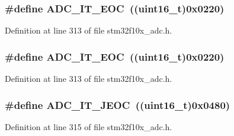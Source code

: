 \subsubsection[{\texorpdfstring{A\+D\+C\+\_\+\+I\+T\+\_\+\+E\+OC}{ADC_IT_EOC}}]{\setlength{\rightskip}{0pt plus 5cm}\#define A\+D\+C\+\_\+\+I\+T\+\_\+\+E\+OC~(({\bf uint16\+\_\+t})0x0220)}\hypertarget{group___a_d_c__interrupts__definition_ga0ad335d835f54415194d448019569e00}{}\label{group___a_d_c__interrupts__definition_ga0ad335d835f54415194d448019569e00}


Definition at line 313 of file stm32f10x\+\_\+adc.\+h.

\subsubsection[{\texorpdfstring{A\+D\+C\+\_\+\+I\+T\+\_\+\+E\+OC}{ADC_IT_EOC}}]{\setlength{\rightskip}{0pt plus 5cm}\#define A\+D\+C\+\_\+\+I\+T\+\_\+\+E\+OC~(({\bf uint16\+\_\+t})0x0220)}\hypertarget{group___a_d_c__interrupts__definition_ga0ad335d835f54415194d448019569e00}{}\label{group___a_d_c__interrupts__definition_ga0ad335d835f54415194d448019569e00}


Definition at line 313 of file stm32f10x\+\_\+adc.\+h.

\subsubsection[{\texorpdfstring{A\+D\+C\+\_\+\+I\+T\+\_\+\+J\+E\+OC}{ADC_IT_JEOC}}]{\setlength{\rightskip}{0pt plus 5cm}\#define A\+D\+C\+\_\+\+I\+T\+\_\+\+J\+E\+OC~(({\bf uint16\+\_\+t})0x0480)}\hypertarget{group___a_d_c__interrupts__definition_gad439fc0cd69706704d47aeabfeddb631}{}\label{group___a_d_c__interrupts__definition_gad439fc0cd69706704d47aeabfeddb631}


Definition at line 315 of file stm32f10x\+\_\+adc.\+h.

